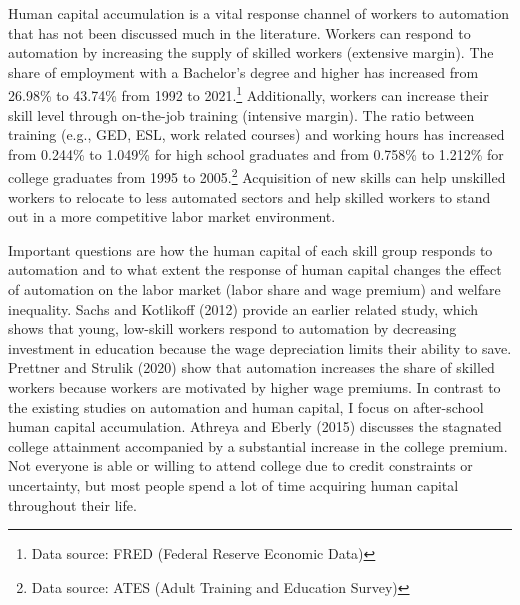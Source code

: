 \documentclass[12pt]{article}
\begin{document}
Human capital accumulation is a vital response channel of workers to automation that has not been discussed much in the literature. Workers can respond to automation by increasing the supply of skilled workers (extensive margin). The share of employment with a Bachelor's degree and higher has increased from 26.98\% to 43.74\% from 1992 to 2021.\footnote{Data source: FRED (Federal Reserve Economic Data)} Additionally, workers can increase their skill level through on-the-job training (intensive margin). The ratio between training (e.g., GED, ESL, work related courses) and working hours has increased from 0.244\% to 1.049\% for high school graduates and from 0.758\% to 1.212\% for college graduates from 1995 to 2005.\footnote{Data source: ATES (Adult Training and Education Survey)} Acquisition of new skills can help unskilled workers to relocate to less automated sectors and help skilled workers to stand out in a more competitive labor market environment. 

Important questions are how the human capital of each skill group responds to automation and to what extent the response of human capital changes the effect of automation on the labor market (labor share and wage premium) and welfare inequality. Sachs and Kotlikoff (2012)\nocite{SachsKotlikoff2012} provide an earlier related study, which shows that young, low-skill workers respond to automation by decreasing investment in education because the wage depreciation limits their ability to save. Prettner and Strulik (2020)\nocite{PrettnerStrulik2020} show that automation increases the share of skilled workers because workers are motivated by higher wage premiums. In contrast to the existing studies on automation and human capital, I focus on after-school human capital accumulation. Athreya and Eberly (2015)\nocite{AthreyaEberly2015} discusses the stagnated college attainment accompanied by a substantial increase in the college premium. Not everyone is able or willing to attend college due to credit constraints or uncertainty, but most people spend a lot of time acquiring human capital throughout their life.
\end{document}

